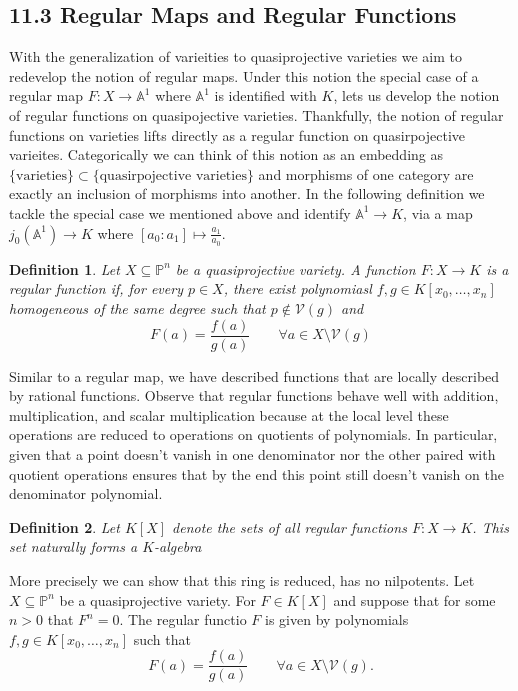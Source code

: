 \documentclass[40pt]{article}
\newtheorem{definition}{Definition}[section]
\newcommand{\Proj}{\mathbb{P}}
\newcommand{\A}{\mathbb{A}}
\newcommand{\V}{\mathcal{V}}
\theoremstyle{remark}
\begin{document}
				\subsection{11.3 Regular Maps and Regular Functions}
				With the generalization of varieities to quasiprojective varieties we aim to redevelop the notion of regular maps. Under this notion the special case of a regular map $F : X \to \A^1$ where $\A^1$ is identified with $K$, lets us develop the notion of regular functions on quasipojective varieties. Thankfully, the notion of regular functions on varieties lifts directly as a regular function on quasirpojective varieites. Categorically we can think of this notion as an embedding as $\{\text{varieties}\} \subset \{\text{quasirpojective varieties}\}$ and 
				morphisms of one category are exactly an inclusion of morphisms into another. In the following definition we tackle the special case we mentioned above and identify $\A^1 \to K$, via a map $j_0(\A^1) \to K$ where $[a_0:a_1] \mapsto \frac{a_1}{a_0}$.
				\begin{definition}
					Let $X \subseteq \Proj^n$ be a quasiprojective variety. A function $F: X \to K$ is a regular function if, for every $p \in X$, there exist polynomiasl $f,g \in K[x_0,\dots,x_n]$ homogeneous of the same degree such that $p \not \in \V(g)$ and
					\[
					F(a) = \frac{f(a)}{g(a)} \quad\quad \forall a \in X \setminus\V(g)
					\]
				\end{definition}
				Similar to a regular map, we have described functions that are locally described by rational functions. Observe that regular functions behave well with addition, multiplication, and scalar multiplication because at the local level these operations are reduced to operations on quotients of polynomials. In particular, given that a point doesn't vanish in one denominator nor the other paired with quotient operations ensures that by the end this point still doesn't vanish on the denominator polynomial. 
				\begin{definition}
					Let $K[X]$ denote the sets of all regular functions $F : X \to K$. This set naturally forms a $K$-algebra
				\end{definition}
				More precisely we can show that this ring is reduced, has no nilpotents. Let $X \subseteq \Proj^n$ be a quasiprojective variety. For $F \in K[X]$ and suppose that for some $n > 0$ that $F^n = 0$. The regular functio $F$ is given by polynomials $f,g \in K[x_0,\dots,x_n]$ such that 
				\[
				F(a) = \frac{f(a)}{g(a)} \quad\quad \forall a \in X \setminus \V(g).
				\]
\end{document}
